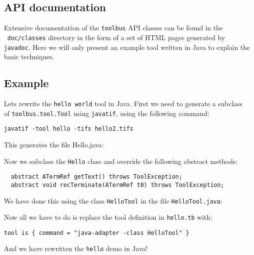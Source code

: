 \subsection{API documentation}

Extensive documentation of the {\tt toolbus} API classes can be found
in the \TB\ {\tt doc/classes} directory in the form of a set of HTML
pages generated by {\tt javadoc}. Here we will only present an example
tool written in Java to explain the basic techniques.

\subsection{Example}

Lets rewrite the {\tt hello world} tool in Java. First we need to
generate a subclass of {\tt toolbus.tool.Tool} using {\tt javatif},
using the following command:

\begin{verbatim}
javatif -tool hello -tifs hello2.tifs
\end{verbatim}

This generates the file Hello.java:



Now we subclass the {\tt Hello} class and override the following 
abstract methods:

\begin{verbatim}
  abstract ATermRef getText() throws ToolException;
  abstract void recTerminate(ATermRef t0) throws ToolException;
\end{verbatim}

We have done this using the class {\tt HelloTool} in the
file {\tt HelloTool.java}:



Now all we have to do is replace the tool definition in {\tt hello.tb}
with:

\begin{verbatim}
tool is { command = "java-adapter -class HelloTool" }
\end{verbatim}

And we have rewritten the {\tt hello} demo in Java!
